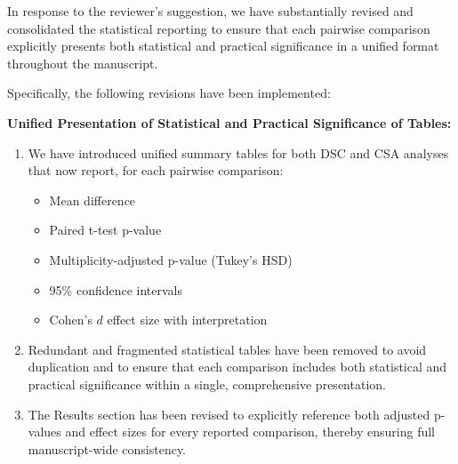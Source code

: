 \documentclass[12pt,letterpaper]{article}
\begin{document}
\begin{enumerate}
In response to the reviewer’s suggestion, we have substantially revised and consolidated the statistical reporting to ensure that each pairwise comparison explicitly presents both statistical and practical significance in a unified format throughout the manuscript.

Specifically, the following revisions have been implemented:






\textbf{Unified Presentation of Statistical and Practical Significance of Tables:}

\begin{enumerate}
    \item We have introduced unified summary tables for both DSC and CSA analyses that now report, for each pairwise comparison:
    \begin{itemize}
        \item Mean difference
        \item Paired t-test p-value
        \item Multiplicity-adjusted p-value (Tukey's HSD)
        \item 95\% confidence intervals
        \item Cohen's $d$ effect size with interpretation
    \end{itemize}

    
    \item Redundant and fragmented statistical tables have been removed to avoid duplication and to ensure that each comparison includes both statistical and practical significance within a single, comprehensive presentation.
    
    \item The Results section has been revised to explicitly reference both adjusted p-values and effect sizes for every reported comparison, thereby ensuring full manuscript-wide consistency.
\end{enumerate}



\end{enumerate}
\end{document}
